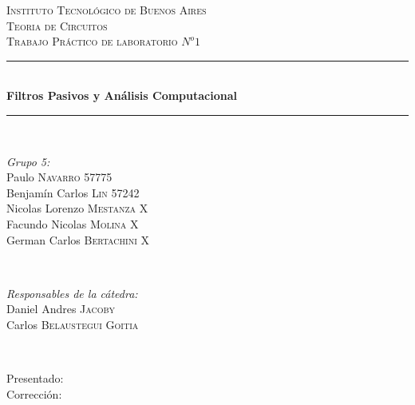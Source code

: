 \begin{titlepage}
\newcommand{\HRule}{\rule{\linewidth}{0.5mm}}
\center
\textsc{\LARGE Instituto Tecnológico de Buenos Aires}\\[1.5cm]
\textsc{\Large Teoria de Circuitos}\\[0.5cm]
\textsc{\large Trabajo Práctico de laboratorio $N^o1$}\\[0.5cm]

\HRule \\[0.4cm]
{ \huge \bfseries Filtros Pasivos y Análisis Computacional}\\[0.1cm] %
\HRule \\[1.5cm]

\begin{minipage}{0.4\textwidth}
\begin{flushleft} \large
\emph{Grupo 5:}\\
Paulo \textsc{Navarro} 57775\\
Benjamín Carlos \textsc{Lin} 57242\\
Nicolas Lorenzo  \textsc{Mestanza} X\\
Facundo Nicolas \textsc{Molina} X\\
German Carlos  \textsc{Bertachini} X\\
\end{flushleft}
\end{minipage}
~
\begin{minipage}{0.4\textwidth}
\begin{flushright} \large
\emph{Responsables de la cátedra:} \\
Daniel Andres \textsc{Jacoby}\\
Carlos \textsc{Belaustegui Goitia}\\

\end{flushright}
\end{minipage}\\[4cm]

\begin{minipage}{0.4\textwidth}
\begin{flushleft} \large
Presentado: \\
Corrección:\\
\end{flushleft}
\end{minipage}
\vfill %

\end{titlepage}
